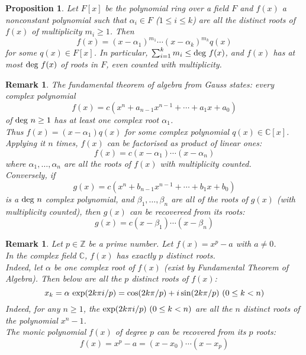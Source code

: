 \documentclass[a4paper,8pt]{article}
\newcommand{\C}{\mathbb{C}}
\newcommand{\Z}{\mathbb{Z}}
\newcommand{\hlt}[1]{\textit{{\color{blue}#1}}}
\newcommand{\degs}[1]{\textnormal{deg}#1}
\newcommand{\exps}[1]{\textnormal{exp}#1}
\theoremstyle{theorem}
\newtheorem{proposition}[theorem]{Proposition}
\newtheorem{remark}[theorem]{Remark}
\begin{document}
\begin{proposition}
Let $F[x]$ be the polynomial ring over a field $F$ and $f(x)$ a nonconstant polynomial such that $\alpha_i \in F$ ($1 \leq i \leq k$) are all the distinct roots of $f(x)$ of multiplicity $m_i \geq 1$. Then
\begin{equation}
f(x) = (x-\alpha_1)^{m_1} \cdots (x-\alpha_k)^{m_k} q(x) \nonumber
\end{equation}
for some $q(x) \in F[x]$. In particular, $\sum_{i=1}^{k} m_i \leq \degs \ f(x)$, and $f(x)$ has at most $\degs \ f(x)$ of roots in $F$, even counted with multiplicity.
\end{proposition}

\begin{remark}
The \hlt{fundamental theorem of algebra} from Gauss states: every complex polynomial
\begin{equation}
f(x) = c(x^n + a_{n-1} x^{n-1} + \cdots + a_1 x + a_0) \nonumber
\end{equation}
of $\degs \ n \geq 1$ has at least one complex root $\alpha_1$. \\
Thus $f(x) = (x-\alpha_1)q(x)$ for some complex polynomial $q(x) \in \C[x]$.\\
Applying it $n$ times, $f(x)$ can be factorised as product of linear ones:
\begin{equation}
f(x) = c(x-\alpha_1)\cdots (x-\alpha_n) \nonumber
\end{equation}
where $\alpha_1, \ldots, \alpha_n$ are all the roots of $f(x)$ with multiplicity counted.\\
Conversely, if
\begin{equation}
g(x) = c(x^n + b_{n-1} x^{n-1} + \cdots + b_1 x + b_0) \nonumber
\end{equation}	
is a $\degs \ n$ complex polynomial, and $\beta_1, \ldots, \beta_n$ are all of the roots of $g(x)$ (with multiplicity counted), then $g(x)$ can be recovereed from its roots:
\begin{equation}
g(x) = c(x-\beta_1)\cdots (x-\beta_n) \nonumber
\end{equation}
\end{remark}

\begin{remark}
Let $p \in \Z$ be a prime number. Let $f(x) = x^p - a$ with $a \neq 0$.\\
In the complex field $\C$, $f(x)$ has exactly $p$ distinct roots.\\
Indeed, let $\alpha$ be one complex root of $f(x)$ (exist by Fundamental Theorem of Algebra). Then below are all the $p$ distinct roots of $f(x)$:
\begin{equation}
x_k = \alpha \ \exps(2k \pi i / p) = \cos(2k \pi / p) + i \sin(2k \pi / p) \ (0\leq k < n) \nonumber
\end{equation}
Indeed, for any $n \geq 1$, the $\exps(2k \pi i / p) \ (0\leq k < n)$ are all the $n$ distinct roots of the polynomial $x^n - 1$.\\
The monic polynomial $f(x)$ of degree $p$ can be recovered from its $p$ roots:
\begin{equation}
f(x) = x^p - a = (x-x_0) \cdots (x-x_p) \nonumber
\end{equation}
\end{remark}
\end{document}
